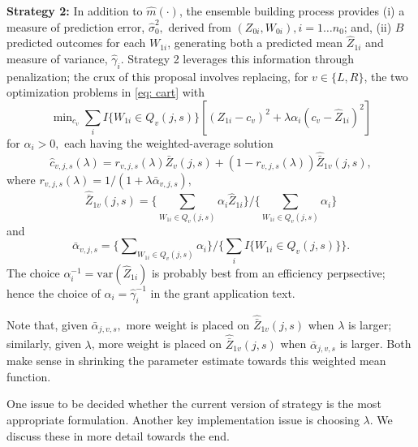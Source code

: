 \documentclass[12pt]{article}
\begin{document}
{\bf Strategy 2:} In addition to $\widehat{m}(\cdot)$, the
ensemble building process provides
(i) a measure of prediction error,
$\hat{\sigma}^2_0,$ derived from $(Z_{0i}, W_{0i}), i = 1 \ldots n_0$;
and, (ii) $B$ predicted outcomes for each $W_{1i}$, generating
both a predicted mean $\widehat{Z}_{1i}$ and measure of
variance, $\hat{\gamma}_{i}.$ Strategy 2 leverages this
information through penalization;
the crux of this proposal involves replacing,
for $v \in \{L,R\}$, the two optimization problems in
\eqref{eq: cart} with
\begin{equation}
\min\nolimits_{c_v} {\textstyle \sum\nolimits}_i I\{W_{1i} \in Q_{v}(j,s)\} \left[ (Z_{1i}-c_v)^2 +
\lambda \alpha_i (c_v-\widehat{Z}_{1i})^2 \right]
\end{equation}
for $\alpha_i > 0,$ each having the weighted-average solution 
\[
\widehat{c}_{v,j,s}(\lambda) =
r_{v,j,s}(\lambda) \bar{Z}_v(j,s) + (1-r_{v,j,s}(\lambda)) \hat{\bar{Z}}_{1v}(j,s),
\]
where $r_{v,j,s}(\lambda) = 1/(1 + \lambda \bar{\alpha}_{v,j,s}),$
\[
\hat{\bar{Z}}_{1v}(j,s) =
\{ {\textstyle \sum\nolimits}_{W_{1i} \in Q_{v}(j,s)} \alpha_i  \hat{Z}_{1i} \}
/ \{ {\textstyle \sum\nolimits}_{W_{1i} \in Q_{v}(j,s)} \alpha_i \}
\]
and
\[
\bar{\alpha}_{v,j,s} = \{ \sum\nolimits_{W_{1i} \in Q_{v}(j,s)} \alpha_i \}
/ \{ \sum_i I\{ W_{1i} \in Q_{v}(j,s) \} \}.
\]
The choice $\alpha^{-1}_i = \mbox{var}( \hat{Z}_{1i} )$ is probably
best from an efficiency perpsective; hence the choice of
$\alpha_i = \hat{\gamma}^{-1}_{i}$ in the grant application text.

Note that, given $\bar{\alpha}_{j,v,s},$  more weight is placed on
$\hat{\bar{Z}}_{1v}(j,s)$ when $\lambda$ is larger; similarly, 
given $\lambda$, more weight is placed on
$\hat{\bar{Z}}_{1v}(j,s)$ when $\bar{\alpha}_{j,v,s}$ is larger.
Both make sense in shrinking the parameter estimate
towards this weighted mean function.

One issue to be decided whether the current version of strategy is the most appropriate 
formulation. Another key implementation issue is choosing $\lambda$. We discuss these
in more detail towards the end.

\end{document}

